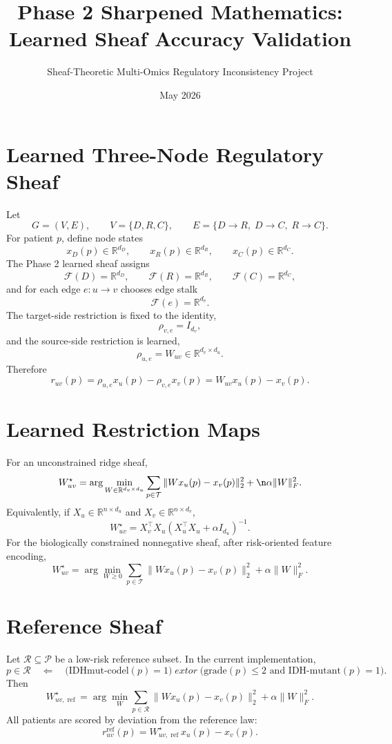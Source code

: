 \documentclass[11pt]{article}
\title{Phase 2 Sharpened Mathematics: Learned Sheaf Accuracy Validation}
\author{Sheaf-Theoretic Multi-Omics Regulatory Inconsistency Project}
\date{May 2026}
\newcommand{\R}{\mathbb{R}}
\newcommand{\F}{\mathcal{F}}
\begin{document}
\maketitle

\tableofcontents

\section{Learned Three-Node Regulatory Sheaf}

Let
\[
G=(V,E),\qquad V=\{D,R,C\},\qquad E=\{D\to R,\;D\to C,\;R\to C\}.
\]
For patient $p$, define node states
\[
x_D(p)\in\R^{d_D},\qquad x_R(p)\in\R^{d_R},\qquad x_C(p)\in\R^{d_C}.
\]
The Phase 2 learned sheaf assigns
\[
\F(D)=\R^{d_D},\qquad \F(R)=\R^{d_R},\qquad \F(C)=\R^{d_C},
\]
and for each edge $e:u\to v$ chooses edge stalk
\[
\F(e)=\R^{d_v}.
\]
The target-side restriction is fixed to the identity,
\[
\rho_{v,e}=I_{d_v},
\]
and the source-side restriction is learned,
\[
\rho_{u,e}=W_{uv}\in\R^{d_v\times d_u}.
\]
Therefore
\[
r_{uv}(p)=\rho_{u,e}x_u(p)-\rho_{v,e}x_v(p)=W_{uv}x_u(p)-x_v(p).
\]

\section{Learned Restriction Maps}

For an unconstrained ridge sheaf,
\[
W_{uv}^{\star}
=
\arg\min_{W\in\R^{d_v\times d_u}}
\sum_{p\in\mathcal T}
\|Wx_u(p)-x_v(p)\|_2^2+\n\alpha\|W\|_F^2.
\]
Equivalently, if $X_u\in\R^{n\times d_u}$ and $X_v\in\R^{n\times d_v}$,
\[
W_{uv}^{\star}=X_v^{\top}X_u(X_u^{\top}X_u+\alpha I_{d_u})^{-1}.
\]
For the biologically constrained nonnegative sheaf, after risk-oriented feature encoding,
\[
W_{uv}^{\star}
=
\arg\min_{W\ge 0}
\sum_{p\in\mathcal T}
\|Wx_u(p)-x_v(p)\|_2^2+
\alpha\|W\|_F^2.
\]

\section{Reference Sheaf}

Let $\mathcal R\subseteq\mathcal P$ be a low-risk reference subset. In the current implementation,
\[
p\in\mathcal R
\quad\Longleftarrow\quad
\bigl(\text{IDHmut-codel}(p)=1\bigr)
\;	ext{or}\;
\bigl(\text{grade}(p)\le 2\text{ and IDH-mutant}(p)=1\bigr).
\]
Then
\[
W_{uv,\operatorname{ref}}^{\star}
=
\arg\min_W
\sum_{p\in\mathcal R}
\|Wx_u(p)-x_v(p)\|_2^2+
\alpha\|W\|_F^2.
\]
All patients are scored by deviation from the reference law:
\[
r^{\operatorname{ref}}_{uv}(p)=W_{uv,\operatorname{ref}}^{\star}x_u(p)-x_v(p).
\]
\end{document}
